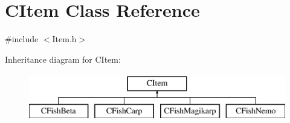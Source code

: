 \hypertarget{class_c_item}{}\section{C\+Item Class Reference}
\label{class_c_item}


{\ttfamily \#include $<$Item.\+h$>$}

Inheritance diagram for C\+Item\+:\begin{figure}[H]
\begin{center}
\leavevmode
\includegraphics[height=2.000000cm]{class_c_item}
\end{center}
\end{figure}
